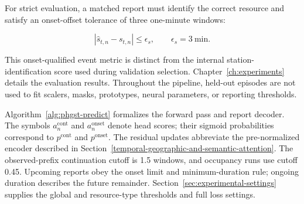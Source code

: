 For strict evaluation, a matched report must identify the correct resource and satisfy an onset-offset tolerance of three one-minute windows:

\[
|\hat s_{t,n}-s_{t,n}|\leq\epsilon_s,\qquad \epsilon_s=3\ \mathrm{min}.
\]

This onset-qualified event metric is distinct from the internal station-identification score used during validation selection. Chapter~\ref{ch:experiments} details the evaluation results. Throughout the pipeline, held-out episodes are not used to fit scalers, masks, prototypes, neural parameters, or reporting thresholds.

Algorithm~\ref{alg:phgst-predict} formalizes the forward pass and report decoder. The symbols \(a_n^{\mathrm{cont}}\) and \(a_n^{\mathrm{onset}}\) denote head scores; their sigmoid probabilities correspond to \(p^{\mathrm{cont}}\) and \(p^{\mathrm{onset}}\). The residual updates abbreviate the pre-normalized encoder described in Section~\ref{temporal-geographic-and-semantic-attention}. The observed-prefix continuation cutoff is 1.5 windows, and occupancy runs use cutoff 0.45. Upcoming reports obey the onset limit and minimum-duration rule; ongoing duration describes the future remainder. Section~\ref{sec:experimental-settings} supplies the global and resource-type thresholds and full loss settings.


